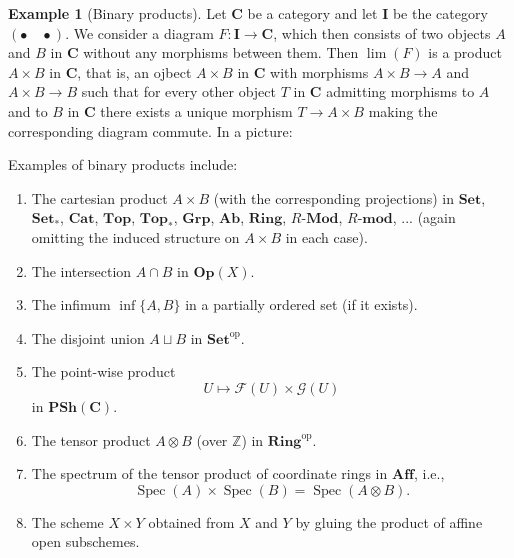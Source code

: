 \documentclass[12pt,reqno,a4paper]{amsart}
\theoremstyle{plain}
\theoremstyle{definition}
\newtheorem{exmp}[thm]{Example}
\theoremstyle{remark}
\begin{document}
\begin{exmp}[Binary products]
  Let $\mathbf{C}$ be a category and let $\mathbf{I}$ be the category $(\bullet \quad \bullet)$.
  We consider a diagram $F \colon \mathbf{I} \to \mathbf{C}$, which then consists of two objects $A$ and $B$ in $\mathbf{C}$ without any morphisms between them.
  Then $\lim(F)$ is a product $A \times B$ in $\mathbf{C}$, that is, an ojbect $A \times B$ in $\mathbf{C}$ with morphisms $A \times B \to A$ and $A \times B \to B$ such that for every other object $T$ in $\mathbf{C}$ admitting morphisms to $A$ and to $B$ in $\mathbf{C}$ there exists a unique morphism $T \to A \times B$ making the corresponding diagram commute.
  In a picture:
  \begin{center}
  \end{center}
  Examples of binary products include:
  \begin{enumerate}
    \item The cartesian product $A \times B$ (with the corresponding projections) in $\mathbf{Set}$, $\mathbf{Set}_{*}$, $\mathbf{Cat}$, $\mathbf{Top}$, $\mathbf{Top}_{*}$, $\mathbf{Grp}$, $\mathbf{Ab}$, $\mathbf{Ring}$, $R$-$\mathbf{Mod}$, $R$-$\mathbf{mod}$, ... (again omitting the induced structure on $A \times B$ in each case).
    \item The intersection $A \cap B$ in $\mathbf{Op}(X)$.
    \item The infimum $\operatorname{inf}\{ A, B\}$ in a partially ordered set (if it exists).
    \item The disjoint union $A \sqcup B$ in $\mathbf{Set}^{\mathrm{op}}$.
    \item The point-wise product
      \[ U \mapsto \mathscr{F}(U) \times \mathscr{G}(U) \]
      in $\mathbf{PSh}(\mathbf{C})$.
    \item The tensor product $A \otimes B$ (over $\mathbb{Z}$) in $\mathbf{Ring}^{\mathrm{op}}$.
    \item The spectrum of the tensor product of coordinate rings in $\mathbf{Aff}$, i.e.,
      \[ \operatorname{Spec}(A) \times \operatorname{Spec}(B) = \operatorname{Spec}(A \otimes B). \]
    \item The scheme $X \times Y$ obtained from $X$ and $Y$ by gluing the product of affine open subschemes.

\end{enumerate}
\end{exmp}
\end{document}

